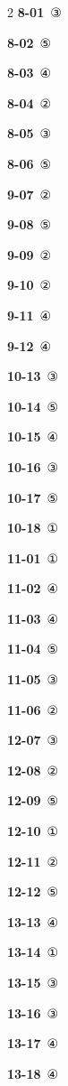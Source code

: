 \documentclass[10pt,a4paper]{article}
\begin{document}
\begin{multicols}{2}\small
\noindent\textbf{8-01}\ ③\par
\noindent\textbf{8-02}\ ⑤\par
\noindent\textbf{8-03}\ ④\par
\noindent\textbf{8-04}\ ②\par
\noindent\textbf{8-05}\ ③\par
\noindent\textbf{8-06}\ ⑤\par
\noindent\textbf{9-07}\ ②\par
\noindent\textbf{9-08}\ ⑤\par
\noindent\textbf{9-09}\ ②\par
\noindent\textbf{9-10}\ ②\par
\noindent\textbf{9-11}\ ④\par
\noindent\textbf{9-12}\ ④\par
\noindent\textbf{10-13}\ ③\par
\noindent\textbf{10-14}\ ⑤\par
\noindent\textbf{10-15}\ ④\par
\noindent\textbf{10-16}\ ③\par
\noindent\textbf{10-17}\ ⑤\par
\noindent\textbf{10-18}\ ①\par
\noindent\textbf{11-01}\ ①\par
\noindent\textbf{11-02}\ ④\par
\noindent\textbf{11-03}\ ④\par
\noindent\textbf{11-04}\ ⑤\par
\noindent\textbf{11-05}\ ③\par
\noindent\textbf{11-06}\ ②\par
\noindent\textbf{12-07}\ ③\par
\noindent\textbf{12-08}\ ②\par
\noindent\textbf{12-09}\ ⑤\par
\noindent\textbf{12-10}\ ①\par
\noindent\textbf{12-11}\ ②\par
\noindent\textbf{12-12}\ ⑤\par
\noindent\textbf{13-13}\ ④\par
\noindent\textbf{13-14}\ ①\par
\noindent\textbf{13-15}\ ③\par
\noindent\textbf{13-16}\ ③\par
\noindent\textbf{13-17}\ ④\par
\noindent\textbf{13-18}\ ④\par

\end{multicols}
\end{document}
